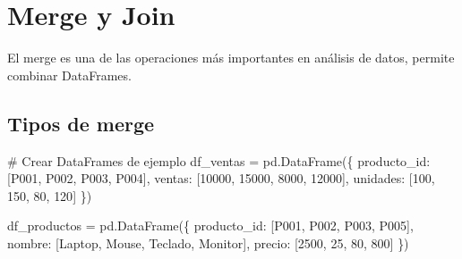 \documentclass[
  doc,
  floatsintext,
  longtable,
  a4paper,
  nolmodern,
  notxfonts,
  notimes,
  12pt,
  colorlinks=true,linkcolor=blue,citecolor=blue,urlcolor=blue]{apa7}
\newenvironment{Shaded}{\begin{snugshade}}{\end{snugshade}}
\newcommand{\CommentTok}[1]{\textcolor[rgb]{0.37,0.37,0.37}{#1}}
\newcommand{\DecValTok}[1]{\textcolor[rgb]{0.68,0.00,0.00}{#1}}
\newcommand{\NormalTok}[1]{\textcolor[rgb]{0.00,0.23,0.31}{#1}}
\newcommand{\OperatorTok}[1]{\textcolor[rgb]{0.37,0.37,0.37}{#1}}
\newcommand{\StringTok}[1]{\textcolor[rgb]{0.13,0.47,0.30}{#1}}
\begin{document}
\section{Merge y Join}\label{merge-y-join}

El merge es una de las operaciones más importantes en análisis de datos,
permite combinar DataFrames.

\subsection{Tipos de merge}\label{tipos-de-merge}

\begin{Shaded}
\begin{Highlighting}[]
\CommentTok{\# Crear DataFrames de ejemplo}
\NormalTok{df\_ventas }\OperatorTok{=}\NormalTok{ pd.DataFrame(\{}
    \StringTok{\textquotesingle{}producto\_id\textquotesingle{}}\NormalTok{: [}\StringTok{\textquotesingle{}P001\textquotesingle{}}\NormalTok{, }\StringTok{\textquotesingle{}P002\textquotesingle{}}\NormalTok{, }\StringTok{\textquotesingle{}P003\textquotesingle{}}\NormalTok{, }\StringTok{\textquotesingle{}P004\textquotesingle{}}\NormalTok{],}
    \StringTok{\textquotesingle{}ventas\textquotesingle{}}\NormalTok{: [}\DecValTok{10000}\NormalTok{, }\DecValTok{15000}\NormalTok{, }\DecValTok{8000}\NormalTok{, }\DecValTok{12000}\NormalTok{],}
    \StringTok{\textquotesingle{}unidades\textquotesingle{}}\NormalTok{: [}\DecValTok{100}\NormalTok{, }\DecValTok{150}\NormalTok{, }\DecValTok{80}\NormalTok{, }\DecValTok{120}\NormalTok{]}
\NormalTok{\})}

\NormalTok{df\_productos }\OperatorTok{=}\NormalTok{ pd.DataFrame(\{}
    \StringTok{\textquotesingle{}producto\_id\textquotesingle{}}\NormalTok{: [}\StringTok{\textquotesingle{}P001\textquotesingle{}}\NormalTok{, }\StringTok{\textquotesingle{}P002\textquotesingle{}}\NormalTok{, }\StringTok{\textquotesingle{}P003\textquotesingle{}}\NormalTok{, }\StringTok{\textquotesingle{}P005\textquotesingle{}}\NormalTok{],}
    \StringTok{\textquotesingle{}nombre\textquotesingle{}}\NormalTok{: [}\StringTok{\textquotesingle{}Laptop\textquotesingle{}}\NormalTok{, }\StringTok{\textquotesingle{}Mouse\textquotesingle{}}\NormalTok{, }\StringTok{\textquotesingle{}Teclado\textquotesingle{}}\NormalTok{, }\StringTok{\textquotesingle{}Monitor\textquotesingle{}}\NormalTok{],}
    \StringTok{\textquotesingle{}precio\textquotesingle{}}\NormalTok{: [}\DecValTok{2500}\NormalTok{, }\DecValTok{25}\NormalTok{, }\DecValTok{80}\NormalTok{, }\DecValTok{800}\NormalTok{]}
\NormalTok{\})}


\end{Highlighting}
\end{Shaded}
\end{document}
